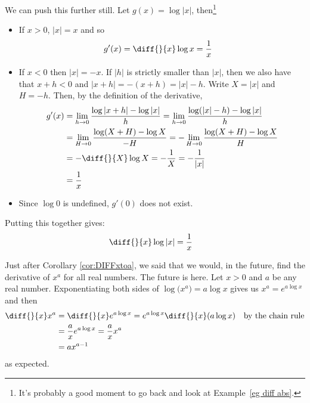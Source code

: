 \begin{eg}\label{eg diff log abs x}
 We can push this further still. Let $g(x) = \log | x |$, then\footnote{It's
probably a good moment to go back and look at Example~\ref{eg diff abs}.}
\begin{itemize}
 \item If $x>0$, $|x|= x$ and so
\begin{align*}
  g'(x) &= \diff{}{x} \log x = \frac{1}{x}
\end{align*}
\item If $x<0$ then $|x|= -x$. If $|h|$ is strictly smaller than $|x|$, 
then we also have  that $x+h<0$ and $|x+h|=-(x+h)=|x|-h$. 
Write $X=|x|$ and $H=-h$. Then, by the definition of the derivative,
\begin{align*}
  g'(x) &= \lim_{h\rightarrow 0} \frac{\log|x+h|-\log|x|}{h}
        = \lim_{h\rightarrow 0} \frac{\log(|x|-h)-\log|x|}{h} \\
        &= \lim_{H\rightarrow 0} \frac{\log(X+H)-\log X}{-H}
        = -\lim_{H\rightarrow 0} \frac{\log(X+H)-\log X}{H} \\
        &=-\diff{}{X}\log X =-\frac{1}{X} = -\frac{1}{|x|} \\
        &=\frac{1}{x}
\end{align*}
\item Since $\log 0$ is undefined, $g'(0)$ does not exist.
\end{itemize}
Putting this together gives:
\begin{align*}
  \diff{}{x} \log | x | &= \frac{1}{x}
\end{align*}
\end{eg}

\begin{eg}\label{eg diff power}
Just after Corollary \ref{cor:DIFFxtoa}, we said that we would, in the future, find the derivative of $x^a$ for all real numbers. The future is here. 
Let $x>0$ and $a$ be any real number. Exponentiating both sides of 
$\log\big(x^a\big)=a\log x$ gives us $x^a=e^{a\log x}$ and then
\begin{align*}
  \diff{}{x} x^a &= \diff{}{x} e^{a\log x}
                  = e^{a\log x} \diff{}{x}(a\log x) &\text{by the chain rule} \\
                 &=\frac{a}{x} e^{a\log x}
                  =\frac{a}{x} x^a \\
                 &=a x^{a-1}
\end{align*}
as expected.
\end{eg}




